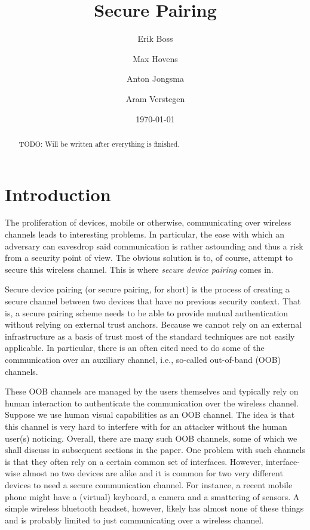 \documentclass[conference, 11pt]{sty/IEEEtran}
\title{Secure Pairing}
\author{Erik Boss \and Max Hovens \and Anton Jongsma \and Aram Verstegen}
\date{\today}
\begin{document}
\maketitle

\begin{abstract}
    TODO: Will be written after everything is finished.
\end{abstract}

\section{Introduction}
\label{sec:introduction}

The proliferation of devices, mobile or otherwise, communicating over wireless channels leads to interesting problems.
In particular, the ease with which an adversary can eavesdrop said communication is rather astounding and thus a risk from a security point of view.
The obvious solution is to, of course, attempt to secure this wireless channel.
This is where \emph{secure device pairing} comes in.

Secure device pairing (or secure pairing, for short) is the process of creating a secure channel between two devices that have no previous security context.
That is, a secure pairing scheme needs to be able to provide mutual authentication without relying on external trust anchors.
Because we cannot rely on an external infrastructure as a basis of trust most of the standard techniques are not easily applicable.
In particular, there is an often cited need to do some of the communication over an auxiliary channel, i.e., so-called out-of-band (OOB) channels.

These OOB channels are managed by the users themselves and typically rely on human interaction to authenticate the communication over the wireless channel.
Suppose we use human visual capabilities as an OOB channel.
The idea is that this channel is very hard to interfere with for an attacker without the human user(s) noticing.
Overall, there are many such OOB channels, some of which we shall discuss in subsequent sections in the paper.
One problem with such channels is that they often rely on a certain common set of interfaces.
However, interface-wise almost no two devices are alike and it is common for two very different devices to need a secure communication channel.
For instance, a recent mobile phone might have a (virtual) keyboard, a camera and a smattering of sensors.
A simple wireless bluetooth headset, however, likely has almost none of these things and is probably limited to just communicating over a wireless channel.
\end{document}
